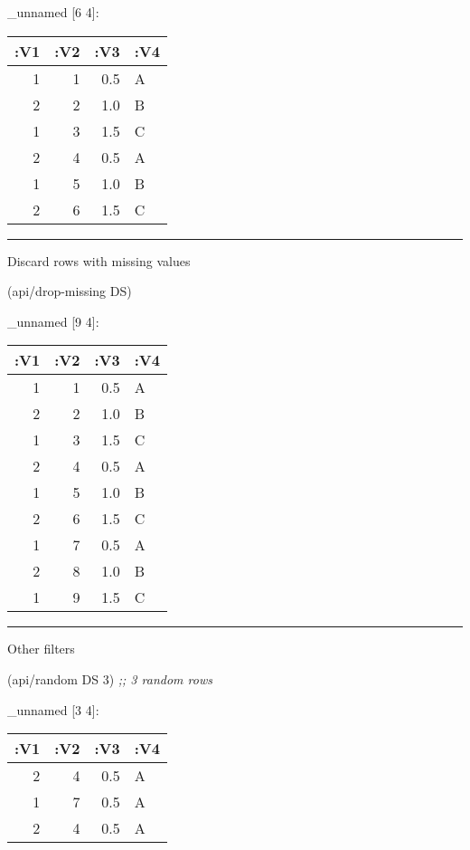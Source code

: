 \documentclass[]{article}
\newenvironment{Shaded}{\begin{snugshade}}{\end{snugshade}}
\newcommand{\DecValTok}[1]{\textcolor[rgb]{0.00,0.00,0.81}{#1}}
\newcommand{\CommentTok}[1]{\textcolor[rgb]{0.56,0.35,0.01}{\textit{#1}}}
\newcommand{\NormalTok}[1]{#1}
\begin{document}
\_unnamed {[}6 4{]}:

\begin{longtable}[]{@{}rrrl@{}}
\toprule
:V1 & :V2 & :V3 & :V4\tabularnewline
\midrule
\endhead
1 & 1 & 0.5 & A\tabularnewline
2 & 2 & 1.0 & B\tabularnewline
1 & 3 & 1.5 & C\tabularnewline
2 & 4 & 0.5 & A\tabularnewline
1 & 5 & 1.0 & B\tabularnewline
2 & 6 & 1.5 & C\tabularnewline
\bottomrule
\end{longtable}

\begin{center}\rule{0.5\linewidth}{0.5pt}\end{center}

Discard rows with missing values

\begin{Shaded}
\begin{Highlighting}[]
\NormalTok{(api/drop-missing DS)}
\end{Highlighting}
\end{Shaded}

\_unnamed {[}9 4{]}:

\begin{longtable}[]{@{}rrrl@{}}
\toprule
:V1 & :V2 & :V3 & :V4\tabularnewline
\midrule
\endhead
1 & 1 & 0.5 & A\tabularnewline
2 & 2 & 1.0 & B\tabularnewline
1 & 3 & 1.5 & C\tabularnewline
2 & 4 & 0.5 & A\tabularnewline
1 & 5 & 1.0 & B\tabularnewline
2 & 6 & 1.5 & C\tabularnewline
1 & 7 & 0.5 & A\tabularnewline
2 & 8 & 1.0 & B\tabularnewline
1 & 9 & 1.5 & C\tabularnewline
\bottomrule
\end{longtable}

\begin{center}\rule{0.5\linewidth}{0.5pt}\end{center}

Other filters

\begin{Shaded}
\begin{Highlighting}[]
\NormalTok{(api/random DS }\DecValTok{3}\NormalTok{) }\CommentTok{;; 3 random rows}
\end{Highlighting}
\end{Shaded}

\_unnamed {[}3 4{]}:

\begin{longtable}[]{@{}rrrl@{}}
\toprule
:V1 & :V2 & :V3 & :V4\tabularnewline
\midrule
\endhead
2 & 4 & 0.5 & A\tabularnewline
1 & 7 & 0.5 & A\tabularnewline
2 & 4 & 0.5 & A\tabularnewline
\bottomrule
\end{longtable}
\end{document}
